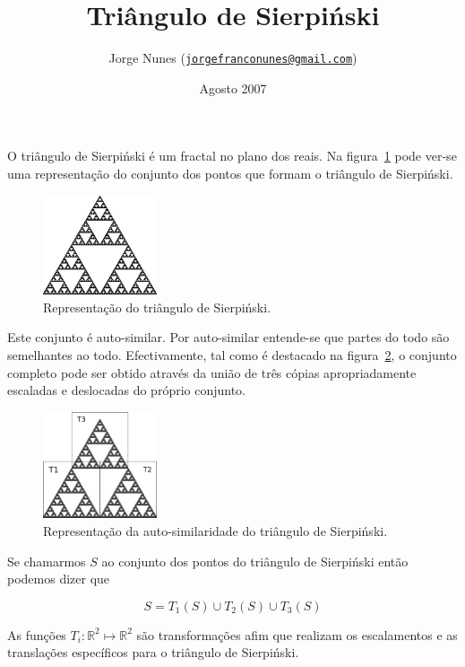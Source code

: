 \documentclass[11pt]{article}
\title{Triângulo de Sierpiński}
\author{Jorge Nunes ({\tt\href{mailto:jorgefranconunes@gmail.com}{jorgefranconunes@gmail.com}})}
\date{Agosto 2007}
\begin{document}
\maketitle

O triângulo de Sierpiński é um fractal no plano dos reais. Na
figura~\ref{fig-triangulo} pode ver-se uma representação do conjunto
dos pontos que formam o triângulo de Sierpiński.

\begin{figure}[H]
  \centering
  \includegraphics[width=0.3\textwidth]{../images/xxx-007.png}
  \caption{Representação do triângulo de Sierpiński.}
  \label{fig-triangulo}
\end{figure}

Este conjunto é auto-similar. Por auto-similar entende-se que partes
do todo são semelhantes ao todo. Efectivamente, tal como é destacado
na figura~\ref{fig-sierpinski}, o conjunto completo pode ser obtido
através da união de três cópias apropriadamente escaladas e deslocadas
do próprio conjunto.

\begin{figure}[H]
  \centering
  \includegraphics[width=0.3\textwidth]{../images/sierpinski.png}
  \caption{Representação da auto-similaridade do triângulo de Sierpiński.}
  \label{fig-sierpinski}
\end{figure}
 
Se chamarmos $S$ ao
conjunto dos pontos do triângulo de Sierpiński então podemos dizer que

\[
S = T_1(S) \cup T_2(S) \cup T_3(S)
\]

As funções $T_i : {\mathbb R}^2 \mapsto {\mathbb R}^2$ são
transformações afim que realizam os escalamentos e as translações
específicos para o triângulo de Sierpiński.
\end{document}
